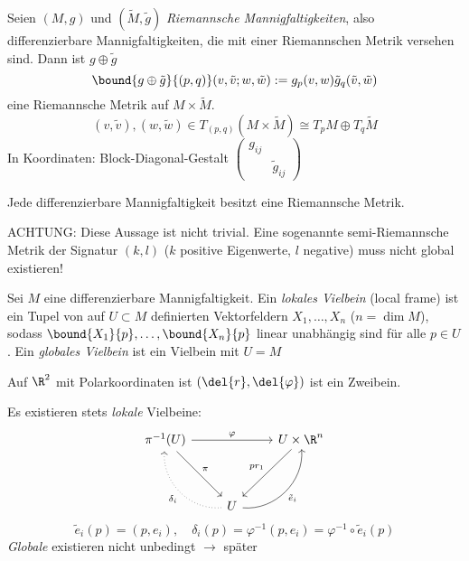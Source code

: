 \begin{defn}
	Seien $ (M,g) $ und $ (\tilde{M},\tilde{g}) $ \emph{Riemannsche Mannigfaltigkeiten}, also differenzierbare Mannigfaltigkeiten, die mit einer Riemannschen Metrik versehen sind. Dann ist $g \oplus \tilde{g}$
	\[ \bound{g \oplus \tilde{g}}{(p,q)}(v,\tilde{v};w,\tilde{w}) := g_p(v,w) \tilde{g}_q(\tilde{v},\tilde{w}) \]
	eine Riemannsche Metrik auf $M \times \tilde{M}$.
	\[ (v,\tilde{v}),(w,\tilde{w}) \in T_{(p,q)}(M \times \tilde{M}) \cong T_pM \oplus T_q\tilde{M} \]
	In Koordinaten: Block-Diagonal-Gestalt $ \begin{pmatrix}
		g_{ij} & \\ & \tilde{g}_{ij}
	\end{pmatrix} $
\end{defn}

\begin{thm}
	Jede differenzierbare Mannigfaltigkeit besitzt eine Riemannsche Metrik.
\end{thm}

\begin{rem*}
	ACHTUNG: Diese Aussage ist nicht trivial. Eine sogenannte semi-Riemannsche Metrik der Signatur $(k,l)$ ($k$ positive Eigenwerte, $l$ negative) muss nicht global existieren!
\end{rem*}

\begin{defn*}
	Sei $M$ eine differenzierbare Mannigfaltigkeit. Ein \emph{lokales Vielbein} (local frame) ist ein Tupel von auf $U \subset M$ definierten Vektorfeldern $ X_1,\dotsc,X_n $ ($n = \dim M$), sodass $ \bound{X_1}{p}, \dotsc, \bound{X_n}{p} $ linear unabhängig sind für alle $p \in U$. Ein \emph{globales Vielbein} ist ein Vielbein mit $U = M$
\end{defn*}

\begin{exmp*}
	Auf $\R^2$ mit Polarkoordinaten ist $ (\del{r},\del{\varphi}) $ ist ein Zweibein.
\end{exmp*}

\begin{rem}\label{6.4}
	Es existieren stets \emph{lokale} Vielbeine:
	\[ \begin{tikzcd}
		\pi^{-1}(U) \arrow{rr}{\varphi} \arrow{ddr}{\pi} & & U \times \R^n \arrow{ddl}[swap]{pr_1}\\
		&&\\
		& U \arrow[bend left = 50, dotted]{luu}{\delta_i} \arrow[bend right=50]{uur}[swap]{\tilde{e}_i} &
	\end{tikzcd} \]
	\[ \tilde{e}_i(p) = (p,e_i),\quad \delta_i(p) = \varphi^{-1} (p,e_i) = \varphi^{-1} \circ \tilde{e}_i(p) \]
	\emph{Globale} existieren nicht unbedingt $\rightarrow$ später
\end{rem}

